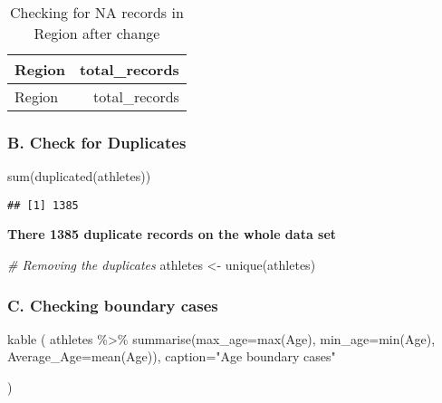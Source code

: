 \documentclass[
]{article}
\newenvironment{Shaded}{\begin{snugshade}}{\end{snugshade}}
\newcommand{\AttributeTok}[1]{\textcolor[rgb]{0.77,0.63,0.00}{#1}}
\newcommand{\CommentTok}[1]{\textcolor[rgb]{0.56,0.35,0.01}{\textit{#1}}}
\newcommand{\FunctionTok}[1]{\textcolor[rgb]{0.00,0.00,0.00}{#1}}
\newcommand{\NormalTok}[1]{#1}
\newcommand{\OtherTok}[1]{\textcolor[rgb]{0.56,0.35,0.01}{#1}}
\newcommand{\SpecialCharTok}[1]{\textcolor[rgb]{0.00,0.00,0.00}{#1}}
\newcommand{\StringTok}[1]{\textcolor[rgb]{0.31,0.60,0.02}{#1}}
\begin{document}
\begin{longtable}[]{@{}lr@{}}
\caption{Checking for NA records in Region after change}\tabularnewline
\toprule
Region & total\_records \\
\midrule
\endfirsthead
\toprule
Region & total\_records \\
\midrule
\endhead
\bottomrule
\end{longtable}

\hypertarget{b.-check-for-duplicates}{%
\subsubsection{B. Check for Duplicates}\label{b.-check-for-duplicates}}

\begin{Shaded}
\begin{Highlighting}[]
\FunctionTok{sum}\NormalTok{(}\FunctionTok{duplicated}\NormalTok{(athletes))}
\end{Highlighting}
\end{Shaded}

\begin{verbatim}
## [1] 1385
\end{verbatim}

\textbf{There 1385 duplicate records on the whole data set}

\begin{Shaded}
\begin{Highlighting}[]
\CommentTok{\# Removing the duplicates}
\NormalTok{athletes }\OtherTok{\textless{}{-}} \FunctionTok{unique}\NormalTok{(athletes)}
\end{Highlighting}
\end{Shaded}

\hypertarget{c.-checking-boundary-cases}{%
\subsubsection{C. Checking boundary
cases}\label{c.-checking-boundary-cases}}

\begin{Shaded}
\begin{Highlighting}[]
\FunctionTok{kable}\NormalTok{ (}
\NormalTok{athletes }\SpecialCharTok{\%\textgreater{}\%}
\FunctionTok{summarise}\NormalTok{(}\AttributeTok{max\_age=}\FunctionTok{max}\NormalTok{(Age), }\AttributeTok{min\_age=}\FunctionTok{min}\NormalTok{(Age), }\AttributeTok{Average\_Age=}\FunctionTok{mean}\NormalTok{(Age)),}
\AttributeTok{caption=}\StringTok{"Age boundary cases"}

\NormalTok{)}
\end{Highlighting}
\end{Shaded}
\end{document}
